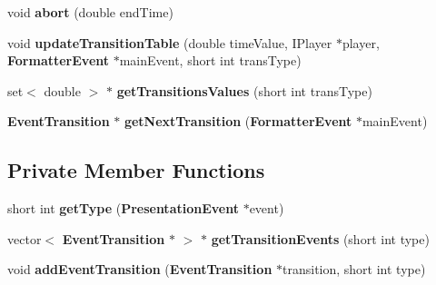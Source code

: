 \begin{CompactItemize}
\item 
void \textbf{abort} (double endTime)\label{classbr_1_1pucrio_1_1telemidia_1_1ginga_1_1ncl_1_1model_1_1event_1_1transition_1_1EventTransitionManager_6ef30b2e34885612cc2731402b1cf61b}

\item 
void \textbf{updateTransitionTable} (double timeValue, IPlayer $\ast$player, {\bf FormatterEvent} $\ast$mainEvent, short int transType)\label{classbr_1_1pucrio_1_1telemidia_1_1ginga_1_1ncl_1_1model_1_1event_1_1transition_1_1EventTransitionManager_02ed7666c4c1b61e716563d09467e2f7}

\item 
set$<$ double $>$ $\ast$ \textbf{getTransitionsValues} (short int transType)\label{classbr_1_1pucrio_1_1telemidia_1_1ginga_1_1ncl_1_1model_1_1event_1_1transition_1_1EventTransitionManager_b95e66d70023507acc899a8737fb6629}

\item 
{\bf EventTransition} $\ast$ \textbf{getNextTransition} ({\bf FormatterEvent} $\ast$mainEvent)\label{classbr_1_1pucrio_1_1telemidia_1_1ginga_1_1ncl_1_1model_1_1event_1_1transition_1_1EventTransitionManager_d99d1444cbbc209e9500edbd73ce53b2}

\end{CompactItemize}
\subsection*{Private Member Functions}
\begin{CompactItemize}
\item 
short int \textbf{getType} ({\bf PresentationEvent} $\ast$event)\label{classbr_1_1pucrio_1_1telemidia_1_1ginga_1_1ncl_1_1model_1_1event_1_1transition_1_1EventTransitionManager_9773ff1adb4fce308031642739f3f1e6}

\item 
vector$<$ {\bf EventTransition} $\ast$ $>$ $\ast$ \textbf{getTransitionEvents} (short int type)\label{classbr_1_1pucrio_1_1telemidia_1_1ginga_1_1ncl_1_1model_1_1event_1_1transition_1_1EventTransitionManager_c9744c4c863bdd133c3dbefb4efc1890}

\item 
void \textbf{addEventTransition} ({\bf EventTransition} $\ast$transition, short int type)\label{classbr_1_1pucrio_1_1telemidia_1_1ginga_1_1ncl_1_1model_1_1event_1_1transition_1_1EventTransitionManager_15f94f94425650ea657b8a666d7e458a}

\end{CompactItemize}
